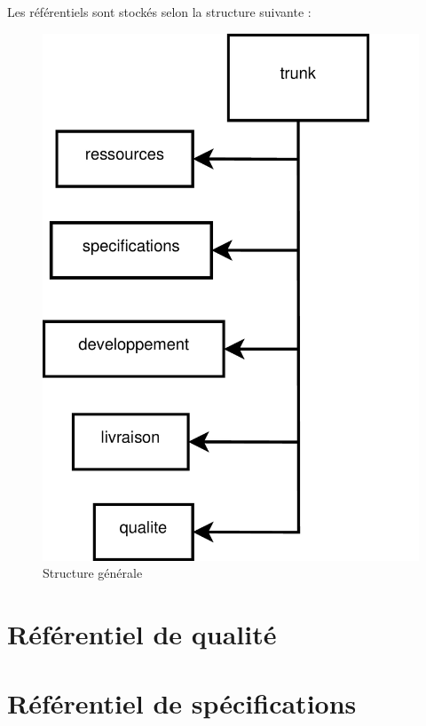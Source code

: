 
Les référentiels sont stockés selon la structure suivante : 

\begin{figure}[ht]
         \begin{center}
         \includegraphics[scale=1.0]{images/arboTrunk}
         \end{center}
         \caption{Structure générale}
 \end{figure}
 
 \section{Référentiel de qualité}
 
  
 \section{Référentiel de spécifications}
 
 
